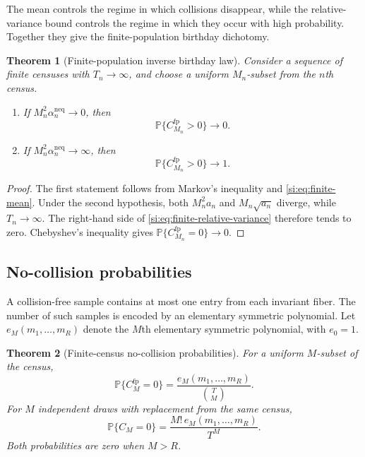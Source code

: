 \documentclass[9pt,twoside]{pnas-new}
\newtheorem{theorem}{Theorem}
\theoremstyle{definition}
\theoremstyle{remark}
\renewcommand{\Pr}{\mathbb{P}}
\newcommand{\neqp}{\mathrm{neq}}
\begin{document}
The mean controls the regime in which collisions disappear, while the relative-variance bound controls the regime in which they occur with high probability. Together they give the finite-population birthday dichotomy.

\begin{theorem}[Finite-population inverse birthday law]
\label{si:thm:finite-zero-one}
Consider a sequence of finite censuses with $T_n\to\infty$, and choose a uniform $M_n$-subset from the $n$th census.
\begin{enumerate}[label=(\roman*)]
 \item If $M_n^2\alpha_n^{\neqp}\to0$, then
 \[
  \Pr\{C_{M_n}^{\mathrm{fp}}>0\}\to0.
 \]
 \item If $M_n^2\alpha_n^{\neqp}\to\infty$, then
 \[
  \Pr\{C_{M_n}^{\mathrm{fp}}>0\}\to1.
 \]
\end{enumerate}
\end{theorem}

\begin{proof}
The first statement follows from Markov's inequality and \eqref{si:eq:finite-mean}.  Under the second hypothesis, both
$M_n^2a_n$ and $M_n\sqrt{a_n}$ diverge, while $T_n\to\infty$.  The right-hand side of \eqref{si:eq:finite-relative-variance} therefore tends to zero.  Chebyshev's inequality gives
$\Pr\{C_{M_n}^{\mathrm{fp}}=0\}\to0$.
\end{proof}

\subsection{No-collision probabilities}
A collision-free sample contains at most one entry from each invariant fiber. The number of such samples is encoded by an elementary symmetric polynomial.
Let $e_M(m_1,\ldots,m_R)$ denote the $M$th elementary symmetric polynomial, with $e_0=1$.

\begin{theorem}[Finite-census no-collision probabilities]
\label{si:thm:exact-finite-curves}
For a uniform $M$-subset of the census,
\begin{equation}
 \Pr\{C_M^{\mathrm{fp}}=0\}
 =\frac{e_M(m_1,\ldots,m_R)}{\binom TM}.
 \label{si:eq:exact-no-collision}
\end{equation}
For $M$ independent draws with replacement from the same census,
\begin{equation}
 \Pr\{C_M=0\}
 =\frac{M!\,e_M(m_1,\ldots,m_R)}{T^M}.
 \label{si:eq:exact-no-collision-wr}
\end{equation}
Both probabilities are zero when $M>R$.
\end{theorem}
\end{document}
